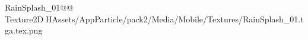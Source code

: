 
   RainSplash_01@   @          	   Texture2D   H   Assets/AppParticle/pack2/Media/Mobile/Textures/RainSplash_01.tga.tex.png